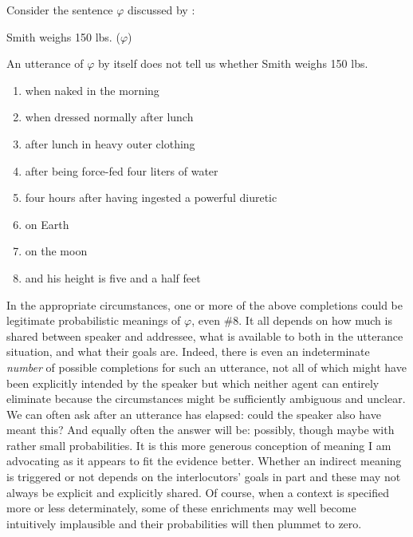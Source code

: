 
Consider the sentence $\varphi$ discussed by \citet{cl:rmp}:

\begin{exe}
\ex Smith weighs 150 lbs. ($\varphi$)
\end{exe}

An utterance of $\varphi$ by itself does not tell us whether Smith weighs 150 lbs.

\begin{enumerate}

\item when naked in the morning
\item when dressed normally after lunch
\item after lunch in heavy outer clothing
\item after being force-fed four liters of water
\item four hours after having ingested a powerful diuretic
\item on Earth
\item on the moon
\item and his height is five and a half feet

\end{enumerate}

In the appropriate circumstances, one or more of the above completions could be legitimate probabilistic meanings of $\varphi$, even \#8. It all depends on how much is shared between speaker and addressee, what is available to both in the utterance situation, and what their goals are. Indeed, there is even an indeterminate \emph{number} of possible completions for such an utterance, not all of which might have been explicitly intended by the speaker but which neither agent can entirely eliminate because the circumstances might be sufficiently ambiguous and unclear. We can often ask after an utterance has elapsed: could the speaker also have meant this? And equally often the answer will be: possibly, though maybe with rather small probabilities. It is this more generous conception of meaning I am advocating as it appears to fit the evidence better. Whether an indirect meaning is triggered or not depends on the interlocutors' goals in part and these may not always be explicit and explicitly shared. Of course, when a context is specified more or less determinately, some of these enrichments may well become intuitively implausible and their probabilities will then plummet to zero.

